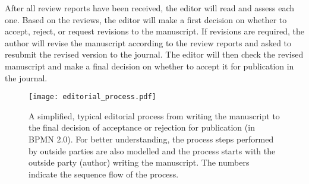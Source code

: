 After all review reports have been received, the editor will read and assess each one. Based on the reviews, the editor will make a first
decision on whether to accept, reject, or request revisions to the manuscript. If revisions are required, the author will revise the manuscript
according to the review reports and asked to resubmit the revised version to the journal. The editor will then check the revised manuscript
and make a final decision on whether to accept it for publication in the journal.

\begin{landscape}
    \begin{figure*}[h!]
        \centering
        \caption{A simplified, typical editorial process from writing the manuscript to the final decision of acceptance or
        rejection for publication (in BPMN 2.0). For better understanding, the process steps performed by outside parties 
        are also modelled and the process starts with the outside party (author) writing the manuscript. The numbers
        indicate the sequence flow of the process.\\~}
        \label{fig:bpmnEditorialProcess}
        \texttt{[image: editorial\_process.pdf]}
    \end{figure*}
\end{landscape}


